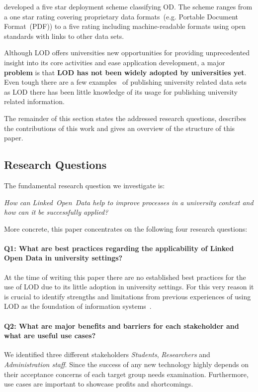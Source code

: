 \documentclass{article}
\begin{document}
\citet{artivle:bernerslee-t-2006-1} developed a five star deployment scheme classifying OD. The scheme ranges from a one star rating covering proprietary data formats~(e.g. Portable Document Format~(PDF)) to a five rating including machine-readable formats using open standards with links to other data sets.

Although LOD offers universities new opportunities for providing unprecedented insight into its core activities and ease application development, a major \textbf{problem} is that \textbf{LOD has not been widely adopted by universities yet}. Even tough there are a few examples~\cite{url:linked-universities-members} of publishing university related data sets as LOD there has been little knowledge of its usage for publishing university related information. 

The remainder of this section states the addressed research questions, describes the contributions of this work and gives an overview of the structure of this paper.

\subsection{Research Questions}
The fundamental research question we investigate is:
\begin{displayquote}
\textit{How can Linked~Open~Data help to improve processes in a university context and how can it be successfully applied?}
\end{displayquote}
More concrete, this paper concentrates on the following four research questions:
\paragraph{Q1: What are best practices regarding the applicability of Linked Open Data in university settings?}
At the time of writing this paper there are no established best practices for the use of LOD due to its little adoption in university settings. For this very reason it is crucial to identify strengths and limitations from previous experiences of using LOD as the foundation of information systems~\cite{url:linked-universities-members}. 
\paragraph{Q2: What are major benefits and barriers for each stakeholder and what are useful use cases?}
We identified three different stakeholders \textit{Students}, \textit{Researchers} and \textit{Administration staff}. Since the success of any new technology highly depends on their acceptance concerns of each target group needs examination. Furthermore, use cases are important to showcase profits and shortcomings. 
\end{document}
